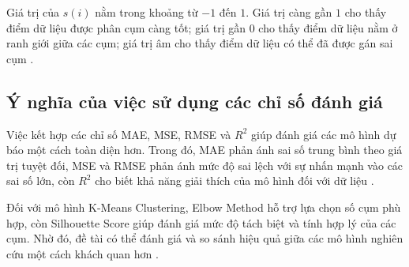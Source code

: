 Giá trị của \(s(i)\) nằm trong khoảng từ \(-1\) đến \(1\). Giá trị càng gần \(1\) cho thấy điểm dữ liệu được phân cụm càng tốt; giá trị gần \(0\) cho thấy điểm dữ liệu nằm ở ranh giới giữa các cụm; giá trị âm cho thấy điểm dữ liệu có thể đã được gán sai cụm \cite{sklearn_silhouette}.

\subsection*{\thesubsection\quad Ý nghĩa của việc sử dụng các chỉ số đánh giá}

Việc kết hợp các chỉ số MAE, MSE, RMSE và \(R^2\) giúp đánh giá các mô hình dự báo một cách toàn diện hơn. Trong đó, MAE phản ánh sai số trung bình theo giá trị tuyệt đối, MSE và RMSE phản ánh mức độ sai lệch với sự nhấn mạnh vào các sai số lớn, còn \(R^2\) cho biết khả năng giải thích của mô hình đối với dữ liệu \cite{sklearn_userguide}.

Đối với mô hình K-Means Clustering, Elbow Method hỗ trợ lựa chọn số cụm phù hợp, còn Silhouette Score giúp đánh giá mức độ tách biệt và tính hợp lý của các cụm. Nhờ đó, đề tài có thể đánh giá và so sánh hiệu quả giữa các mô hình nghiên cứu một cách khách quan hơn \cite{sklearn_kmeans,sklearn_silhouette}.

